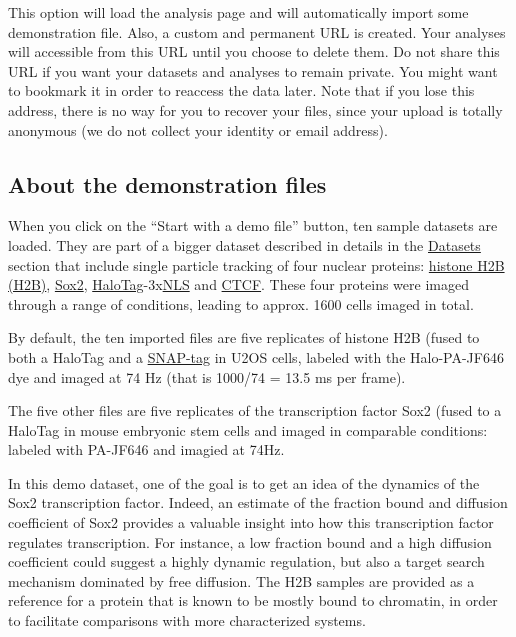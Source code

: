 This option will load the analysis page and will automatically import some demonstration file. Also, a custom and permanent URL is created. Your analyses will accessible from this URL until you choose to delete them. Do not share this URL if you want your datasets and analyses to remain private. You might want to bookmark it in order to reaccess the data later. Note that if you lose this address, there is no way for you to recover your files, since your upload is totally anonymous (we do not collect your identity or email address).

\subsection{About the demonstration files}

When you click on the ``Start with a demo file'' button, ten sample datasets are loaded. They are part of a bigger dataset described in details in the \href{https://spoton.berkeley.edu/SPTGUI/docs/latest#datasets}{Datasets} section that include single particle tracking of four nuclear proteins: \href{https://en.wikipedia.org/wiki/Histone_H2B}{histone H2B (H2B)}, \href{https://en.wikipedia.org/wiki/SOX2}{Sox2}, \href{https://en.wikipedia.org/wiki/HaloTag}{HaloTag}-3x\href{https://en.wikipedia.org/wiki/Nuclear_localization_sequence}{NLS} and \href{https://en.wikipedia.org/wiki/CTCF}{CTCF}. These four proteins were imaged through a range of conditions, leading to approx. 1600 cells imaged in total.

By default, the ten imported files are five replicates of histone H2B (fused to both a HaloTag and a \href{https://en.wikipedia.org/wiki/SNAP-tag}{SNAP-tag} in U2OS cells, labeled with the Halo-PA-JF646 dye and imaged at 74 Hz (that is 1000/74 = 13.5 ms per frame).

The five other files are five replicates of the transcription factor Sox2 (fused to a HaloTag in mouse embryonic stem cells and imaged in comparable conditions: labeled with PA-JF646 and imagied at 74Hz.

In this demo dataset, one of the goal is to get an idea of the dynamics of the Sox2 transcription factor. Indeed, an estimate of the fraction bound and diffusion coefficient of Sox2 provides a valuable insight into how this transcription factor regulates transcription. For instance, a low fraction bound and a high diffusion coefficient could suggest a highly dynamic regulation, but also a target search mechanism dominated by free diffusion. The H2B samples are provided as a reference for a protein that is known to be mostly bound to chromatin, in order to facilitate comparisons with more characterized systems.

